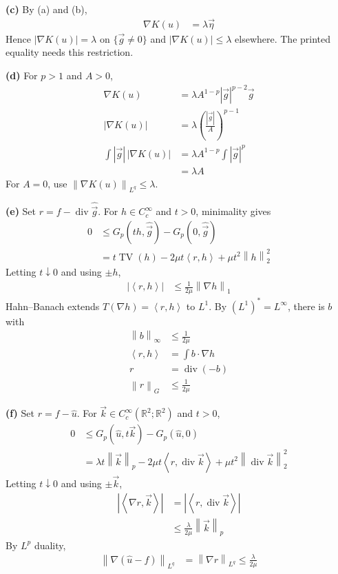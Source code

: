 \documentclass[12pt,letterpaper]{article}
\newcommand{\R}{\mathbb R}
\newcommand{\TV}{\operatorname{TV}}
\newcommand{\diver}{\operatorname{div}}
\newcommand{\norm}[1]{\left\lVert #1\right\rVert}
\newcommand{\ip}[2]{\left\langle #1,#2\right\rangle}
\newcommand{\partlabel}[1]{\par\medskip\noindent\textbf{(#1)}\enspace}
\begin{document}
\partlabel{c}
By (a) and (b),
\begin{align*}
 \nabla K(u)&=\lambda\vec\eta
\end{align*}
Hence $|\nabla K(u)|=\lambda$ on $\{\vec g\ne0\}$ and
$|\nabla K(u)|\leq\lambda$ elsewhere. The printed equality needs
this restriction.

\partlabel{d}
For $p>1$ and $A>0$,
\begin{align*}
 \nabla K(u)&=\lambda A^{1-p}|\vec g|^{p-2}\vec g\\
 |\nabla K(u)|&=\lambda\left(\frac{|\vec g|}{A}\right)^{p-1}\\
 \int|\vec g|\,|\nabla K(u)|
 &=\lambda A^{1-p}\int|\vec g|^p\\
 &=\lambda A
\end{align*}
For $A=0$, use $\norm{\nabla K(u)}_{L^q}\leq\lambda$.

\partlabel{e}
Set $r=f-\diver\hat{\vec g}$.
For $h\in C_c^\infty$ and $t>0$, minimality gives
\begin{align*}
 0&\leq G_p(th,\hat{\vec g})-G_p(0,\hat{\vec g})\\
 &=t\TV(h)-2\mu t\ip rh+\mu t^2\norm h_2^2
\end{align*}
Letting $t\downarrow0$ and using $\pm h$,
\begin{align*}
 |\ip rh|&\leq\frac1{2\mu}\norm{\nabla h}_1
\end{align*}
Hahn--Banach extends $T(\nabla h)=\ip rh$ to $L^1$.
By $(L^1)^*=L^\infty$, there is $b$ with
\begin{align*}
 \norm b_\infty&\leq\frac1{2\mu}\\
 \ip rh&=\int b\cdot\nabla h\\
 r&=\diver(-b)\\
 \norm r_G&\leq\frac1{2\mu}
\end{align*}

\clearpage
\partlabel{f}
Set $r=f-\hat u$. For $\vec k\in C_c^\infty(\R^2;\R^2)$ and $t>0$,
\begin{align*}
 0&\leq G_p(\hat u,t\vec k)-G_p(\hat u,0)\\
 &=\lambda t\norm{\vec k}_p
   -2\mu t\ip r{\diver\vec k}
   +\mu t^2\norm{\diver\vec k}_2^2
\end{align*}
Letting $t\downarrow0$ and using $\pm\vec k$,
\begin{align*}
 |\ip{\nabla r}{\vec k}|
 &=|\ip r{\diver\vec k}|\\
 &\leq\frac\lambda{2\mu}\norm{\vec k}_p
\end{align*}
By $L^p$ duality,
\begin{align*}
 \norm{\nabla(\hat u-f)}_{L^q}
 &=\norm{\nabla r}_{L^q}\leq\frac\lambda{2\mu}
\end{align*}
\end{document}
